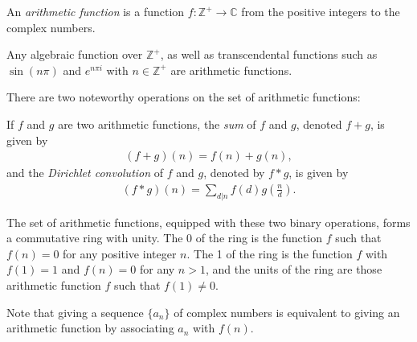 \documentclass[12pt]{article}
\newcommand{\mb}{\mathbb}
\newcommand{\ra}{\rightarrow}
\newcommand{\Z}{\mb{Z}}
\newcommand{\<}{\langle}
\renewcommand{\>}{\rangle}
\begin{document}
An \emph{arithmetic function} is a function $f:\Z^+\ra\mathbb{C}$ from the positive integers to the complex numbers.

Any algebraic function over $\Z^+$, as well as transcendental functions such as $\sin(n\pi)$ and $e^{n\pi i}$ with $n\in \Z^+$ are arithmetic functions.

There are two noteworthy operations on the set of arithmetic functions:

If $f$ and $g$ are two arithmetic functions, the \emph{sum} of $f$ and $g$, denoted $f+g$, is given by 
\begin{align*}
(f+g)(n)=f(n)+g(n),
\end{align*}
and the \emph{Dirichlet convolution} of $f$ and $g$, denoted by $f*g$, is given by
\begin{align*}
(f*g)(n)=\sum_{d|n}f(d)g\left(\frac{n}{d}\right).
\end{align*}

The set of arithmetic functions, equipped with these two binary operations, forms a commutative ring with unity.  The 0 of the ring is the function $f$ such that $f(n)=0$ for any positive integer $n$.  The 1 of the ring is the function $f$ with $f(1)=1$ and  $f(n)=0$ for any $n>1$, and the units of the ring are those arithmetic function $f$ such that $f(1)\neq 0$.

Note that giving a sequence $\{a_n\}$ of complex numbers is equivalent to giving an arithmetic function by associating $a_n$ with $f(n)$.
\end{document}
